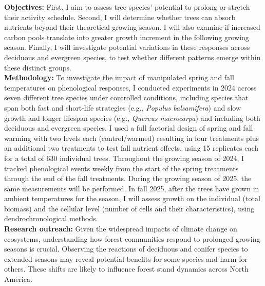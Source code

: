 \documentclass[12pt]{article}
\begin{document}
\textbf {Objectives:} First, I aim to assess tree species' potential to prolong or stretch their activity schedule. Second, I will determine whether trees can absorb nutrients beyond their theoretical growing season. I will also examine if increased carbon pools translate into greater growth increment in the following growing season. Finally, I will investigate potential variations in these responses across deciduous and evergreen species, to test whether different patterns emerge within these distinct groups.\\ %
\textbf {Methodology:} To investigate the impact of manipulated spring and fall temperatures on phenological responses, I conducted experiments in 2024 across seven different tree species under controlled conditions, including species that span both fast and short-life strategies (e.g., \emph{Populus balsamifera}) and slow growth and longer lifespan species (e.g., \emph{Quercus macrocarpa}) and including both deciduous and evergreen species.\citep{jonsson_annual_2010} I used a full factorial design of spring and fall warming with two levels each (control/warmed) resulting in four treatments plus an additional two treatments to test fall nutrient effects, using 15 replicates each for a total of 630 individual trees. %
Throughout the growing season of 2024, I tracked phenological events weekly from the start of the spring treatments through the end of the fall treatments. During the growing season of 2025, the same measurements will be performed. In fall 2025, after the trees have grown in ambient temperatures for the season, I will assess growth on the individual (total biomass) and the cellular level (number of cells and their characteristics), using dendrochronological methods.\\
\textbf{Research outreach:} Given the widespread impacts of climate change on ecosystems, understanding how forest communities respond to prolonged growing seasons is crucial. Observing the reactions of deciduous and conifer species to extended seasons may reveal potential benefits for some species and harm for others. These shifts are likely to influence forest stand dynamics across North America.


\end{document}
